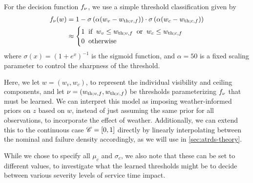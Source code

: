 \begin{proposition}
    For the decision function $f_{\nu}$, we use a simple threshold classification given by
    \begin{align}
        \fvd{w} & = 1 - \sigma\left(\alpha (w_v-\wthvf)\right)\cdot \sigma\left(\alpha (w_c-\wthcf )\right) \\
        &\approx \begin{cases}
            1 \;\; \text{if} \;\; w_v \leq \wthvf \;\; \text{or}\;\;  w_c \leq \wthcf \\
            0 \;\; \text{otherwise}
        \end{cases}
    \end{align}
    where $\sigma(x)=(1+e^{x})^{-1}$ is the sigmoid function, and $\alpha = 50$ is a fixed scaling parameter to control the sharpness of the threshold.
\end{proposition}


Here, we let $w = (w_v, w_c) $, to represent the individual visibility and ceiling components, and let $\nu = (w_{\mathrm{th};v,f},w_{\mathrm{th};c,f})$ be thresholds parameterizing $f_{\nu}$ that must be learned. We can interpret this model as imposing weather-informed priors on $z$ based on $w$, instead of just assuming the same prior for all observations, to incorporate the effect of weather. Additionally, we can extend this to the continuous case $\mathscr{C}=[0,1]$ directly by linearly interpolating between the nominal and failure density accordingly, as we will use in \cref{sec:atrds-theory}.

While we chose to specify all $\mu_c$ and $\sigma_c$, we also note that these can be set to different values, to investigate what the learned thresholds might be to decide between various severity levels of service time impact. 